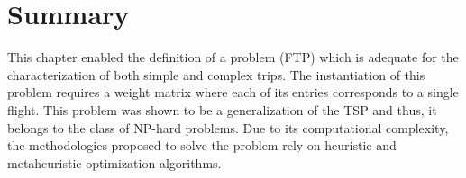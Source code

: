 \section{Summary}
\label{sec:summary_pf}

This chapter enabled the definition of a problem (FTP) which is adequate for the characterization of both simple and complex trips. The instantiation of this problem requires a weight matrix where each of its entries corresponds to a single flight. This problem was shown to be a generalization of the TSP and thus, it belongs to the class of NP-hard problems. Due to its computational complexity, the methodologies proposed to solve the problem rely on heuristic and metaheuristic optimization algorithms.